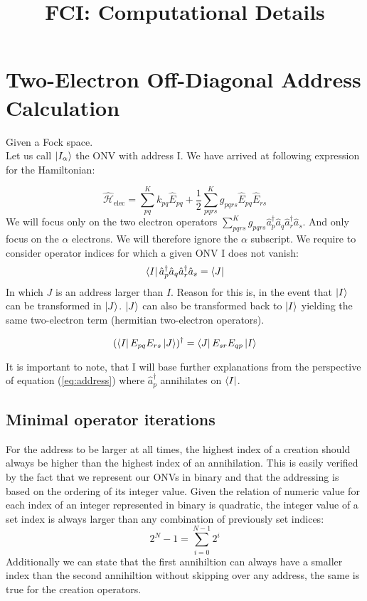 \documentclass[12p]{article}
\title{FCI: Computational Details}
\author{}
\begin{document}
\maketitle

\section{Two-Electron Off-Diagonal Address Calculation}

Given a Fock space.
\\
Let us call $\ket{I_{\alpha}}$ the ONV with address I.
We have arrived at following expression for the Hamiltonian:

      \begin{equation}\label{eq:ham}
          \hat{\mathcal{H}}_\text{elec} = \sum_{pq}^K k_{pq} \hat{E}_{pq} + \frac{1}{2} \sum_{pqrs}^K g_{pqrs} \hat{E}_{pq} \hat{E}_{rs}
      \end{equation}
We will focus only on the two electron operators $ \sum_{pqrs}^K g_{pqrs} \hat{a}^{\dagger}_{p} \hat{a}_{q}  \hat{a}^{\dagger}_{r} \hat{a}_{s}$. And only focus on the $\alpha$ electrons. We will therefore ignore the $\alpha$ subscript.
We require to consider operator indices for which a given ONV I does not vanish:
\begin{equation} \label{eq:address}
  \bra{I} \hat{a}^{\dagger}_{p} \hat{a}_{q} \hat{a}^{\dagger}_{r} \hat{a}_{s} = \bra{J}
\end{equation}
In which $J$ is an address larger than $I$. Reason for this is, in the event that $\ket{I}$ can be transformed in $\ket{J}$. $\ket{J}$ can also be transformed back to $\ket{I}$ yielding the same two-electron term (hermitian two-electron operators).

\begin{equation}
  (\bra{I} E_{pq} E_{rs} \ket{J})^\dagger = \bra{J} E_{sr} E_{qp} \ket{I}
\end{equation}

It is important to note, that I will base further explanations from the perspective of equation (\ref{eq:address}) where $\hat{a}^{\dagger}_{p}$ annihilates on $\bra{I}$.

\subsection{Minimal operator iterations}
For the address to be larger at all times, the highest index of a creation should always be higher than the highest index of an annihilation. This is easily verified by the fact that we represent our ONVs in binary and that the addressing is based on the ordering of its integer value. Given the relation of numeric value for each index of an integer represented in binary is quadratic, the integer value of a set index is always larger than any combination of previously set indices:
\begin{equation}
  2^N - 1 = \sum^{N-1}_{i=0} 2^i
\end{equation}
Additionally we can state that the first annihiltion can always have a smaller index than the second annihiltion without skipping over any address, the same is true for the creation operators.
\end{document}
